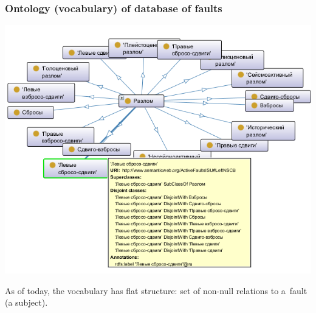 \documentclass[10pt]{beamer}
\begin{document}
\begin{frame}
  \frametitle{Ontology (vocabulary) of database of faults}
  \begin{center}
    \includegraphics[width=\linewidth]{faults-ontology-view-short.png}
  \end{center}
  As of today, the vocabulary has flat structure: set of non-null relations to a~fault (a subject).
\end{frame}
\end{document}
